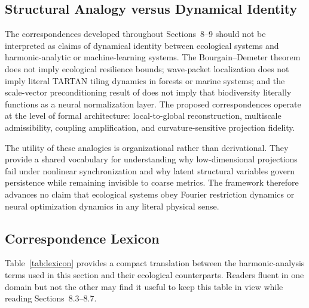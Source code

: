 \documentclass[12pt]{article}
\begin{document}
\subsection{Structural Analogy versus Dynamical Identity}

The correspondences developed throughout Sections~8--9 should not be interpreted as claims of
dynamical identity between ecological systems and harmonic-analytic or machine-learning systems.
The Bourgain--Demeter theorem does not imply ecological resilience bounds; wave-packet
localization does not imply literal TARTAN tiling dynamics in forests or marine systems; and
the scale-vector preconditioning result of \citet{Wang2026} does not imply that biodiversity
literally functions as a neural normalization layer. The proposed correspondences operate at
the level of formal architecture: local-to-global reconstruction, multiscale admissibility,
coupling amplification, and curvature-sensitive projection fidelity.

The utility of these analogies is organizational rather than derivational. They provide a
shared vocabulary for understanding why low-dimensional projections fail under nonlinear
synchronization and why latent structural variables govern persistence while remaining
invisible to coarse metrics. The framework therefore advances no claim that ecological systems
obey Fourier restriction dynamics or neural optimization dynamics in any literal physical
sense.

\subsection{Correspondence Lexicon}

Table~\ref{tab:lexicon} provides a compact translation between the harmonic-analysis
terms used in this section and their ecological counterparts. Readers fluent in one domain
but not the other may find it useful to keep this table in view while reading
Sections~8.3--8.7.
\end{document}
